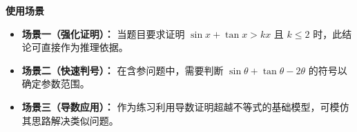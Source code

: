 \begin{explanationbox}
\medskip
\textbf{\textcolor{CExplanation}{使用场景}}
\begin{itemize}[leftmargin=*, itemsep=0.5em, topsep=0.4em]
    \item \textbf{场景一（强化证明）：} 当题目要求证明 $\sin x + \tan x > kx$ 且 $k \le 2$ 时，此结论可直接作为推理依据。
    \item \textbf{场景二（快速判号）：} 在含参问题中，需要判断 $\sin \theta + \tan \theta - 2\theta$ 的符号以确定参数范围。
    \item \textbf{场景三（导数应用）：} 作为练习利用导数证明超越不等式的基础模型，可模仿其思路解决类似问题。
\end{itemize}
\end{explanationbox}
